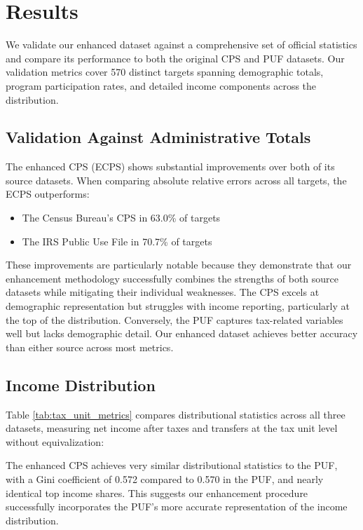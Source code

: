 \section{Results}

We validate our enhanced dataset against a comprehensive set of official statistics and compare its performance to both the original CPS and PUF datasets. Our validation metrics cover 570 distinct targets spanning demographic totals, program participation rates, and detailed income components across the distribution.

\subsection{Validation Against Administrative Totals}

The enhanced CPS (ECPS) shows substantial improvements over both of its source datasets. When comparing absolute relative errors across all targets, the ECPS outperforms:
\begin{itemize}
    \item The Census Bureau's CPS in 63.0\% of targets
    \item The IRS Public Use File in 70.7\% of targets
\end{itemize}

These improvements are particularly notable because they demonstrate that our enhancement methodology successfully combines the strengths of both source datasets while mitigating their individual weaknesses. The CPS excels at demographic representation but struggles with income reporting, particularly at the top of the distribution. Conversely, the PUF captures tax-related variables well but lacks demographic detail. Our enhanced dataset achieves better accuracy than either source across most metrics.

\subsection{Income Distribution}

Table \ref{tab:tax_unit_metrics} compares distributional statistics across all three datasets, measuring net income after taxes and transfers at the tax unit level without equivalization:



The enhanced CPS achieves very similar distributional statistics to the PUF, with a Gini coefficient of 0.572 compared to 0.570 in the PUF, and nearly identical top income shares. This suggests our enhancement procedure successfully incorporates the PUF's more accurate representation of the income distribution. 


